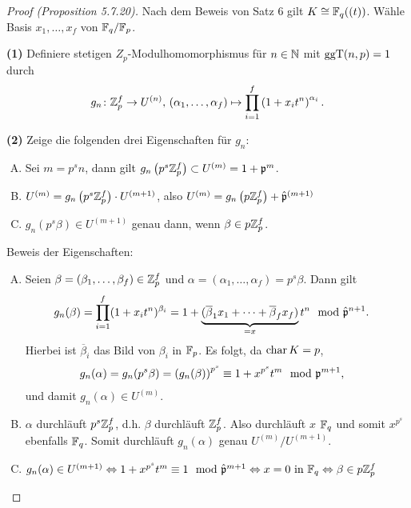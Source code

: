 \begin{proof}[Proof (Proposition 5.7.20)]
	Nach dem Beweis von Satz 6 gilt $K \cong \mathbb{F}_q((t))$.
	Wähle Basis $x_1,\dots,x_f$ von $\mathbb{F}_q / \mathbb{F}_p$.
	
	\bigskip \textbf{(1)} Definiere stetigen $Z_p$-Modulhomomorphismus für $n\in\mathbb{N}$ mit $\operatorname{ggT}(n,p) =1 $ durch
	\[ g_n \colon \mathbb{Z}_p^f \to U^{(n)}, \, (\alpha_1,\dots,\alpha_f) \mapsto
	\prod_{i=1}^{f} \left( 1+ x_it^n \right)^{\alpha_i}.
	\]
	
	\bigskip \textbf{(2)} Zeige die folgenden drei Eigenschaften für $g_n$:
	\begin{enumerate}[(A)]
		\item Sei $m=p^sn$, dann gilt $g_n \left( p^s \mathbb{Z}_p^f \right) \subset U^{(m)} = 1 + \mathfrak{p}^m$.
		\item $U^{(m)} =  g_n \left( p^s \mathbb{Z}_p^f \right) \cdot U^{(m+1)}$, also
				$U^{(m)} =  g_n \left( p \mathbb{Z}_p^f \right) + \hat{\mathfrak{p}}^{(m+1)}$
		\item$g_n\left( p^s\beta \right) \in U^{(m+1)}$ genau dann, wenn $\beta \in p \mathbb{Z}_p^f$.
	\end{enumerate}
	Beweis der Eigenschaften:
	\begin{enumerate}[(A)]
		\item Seien $\beta = (\beta_1, \dots, \beta_f) \in \mathbb{Z}_p^f$ und $\alpha=(\alpha_1,\dots, \alpha_f) = p^s\beta$. Dann gilt
		\begin{align*}
		g_n(\beta)
		&=\prod_{i=1}^{f} (1+x_it^n)^{\beta_i}
		= 1 + \underbrace{(\overline{\beta}_1 x_1 + \dots + \overline{\beta}_f x_f)}_{=x} t^n \mod \hat{\mathfrak{p}}^{n+1}.
		\end{align*}
		Hierbei ist $\overline{\beta}_i$ das Bild von $\beta_i$ in $\mathbb{F}_p$. Es folgt, da $\operatorname{char} K = p$,
		\begin{align*}
		g_n(\alpha)
		&= g_n(p^s\beta)
		= \left( g_n(\beta) \right)^{p^s}
		\equiv 1 + x^{p^s} t^m \mod {\mathfrak{p}}^{m+1},
		\end{align*}
		und damit $g_n(\alpha) \in U^{(m)}$.
		
		\item $\alpha$ durchläuft $p^s\mathbb{Z}_p^f$, d.h. $\beta$ durchläuft $\mathbb{Z}_p^f$. Also durchläuft $x$ $\mathbb{F}_q$ und somit $x^{p^s}$ ebenfalls $\mathbb{F}_q$. Somit durchläuft $g_n(\alpha)$ genau $U^{(m)} / U^{(m+1)}$.
		
		\item $g_n(\alpha) \in U^{(m+1)} \Leftrightarrow 1+x^{p^s} t^m \equiv 1 \mod \hat{\mathfrak{p}}^{m+1} \Leftrightarrow x = 0 \text{ in } \mathbb{F}_q 
		\Leftrightarrow \beta \in p \mathbb{Z}_p^f$
	\end{enumerate}
	

\end{proof}
